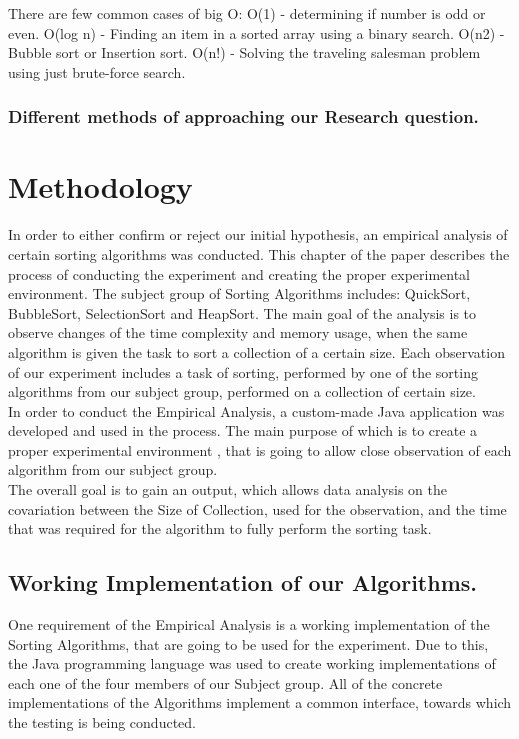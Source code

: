 \documentclass[]{report}
\begin{document}
		There are few common cases of big O:
		O(1) - determining if number is odd or even.
		O(log n) - Finding an item in a sorted array using a binary search.
		O(n2) - Bubble sort or Insertion sort.
		O(n!) - Solving the traveling salesman problem using just brute-force search.
		\subsubsection{Different methods of approaching our Research question.}
		\clearpage
\section{Methodology}
In order to either confirm or reject our initial hypothesis, an empirical analysis of certain sorting algorithms was conducted. This chapter of the paper describes the process of conducting the experiment and creating the proper experimental environment. The subject group of Sorting Algorithms includes: QuickSort, BubbleSort, SelectionSort and HeapSort. The main goal of the analysis is to observe changes of the time complexity and memory usage, when the same algorithm is given the task to sort a collection of a certain size. Each observation of our experiment includes a task of sorting, performed by one of the sorting algorithms from our subject group, performed on a collection of certain size.\\
In order to conduct the Empirical Analysis, a custom-made Java application was developed and used in the process. The main purpose  of which is to create a proper experimental environment , that is going to allow close observation of each algorithm from our subject group. \\
The overall goal is to gain an output, which allows data analysis on the covariation between the Size of Collection, used for the observation, and the time that was required for the algorithm to fully perform the sorting task.
	\subsection{Working Implementation of our Algorithms.}
	One requirement of the Empirical Analysis is a working implementation of the Sorting Algorithms, that are going to be used for the experiment. Due to this, the Java programming language was used to create working implementations of each one of the four members of our Subject group. All of the concrete implementations of the Algorithms implement a common interface, towards which the testing is being conducted.
\end{document}
